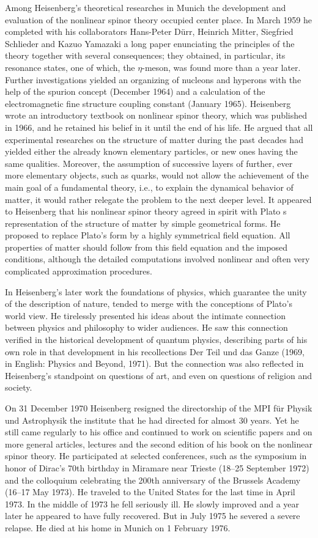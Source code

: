 \documentclass{article}
\begin{document}
Among Heisenberg's theoretical researches in Munich the development and evaluation of the nonlinear spinor theory occupied center place. In March 1959 he completed with his collaborators Hans-Peter Dürr, Heinrich Mitter, Siegfried Schlieder and Kazuo Yamazaki a long paper enunciating the principles of the theory together with several consequences; they obtained, in particular, its resonance states, one of which, the $\eta$-meson, was found more than a year later. Further investigations yielded an organizing of nucleons and hyperons with the help of the spurion concept (December 1964) and a calculation of the electromagnetic fine structure coupling constant (January 1965). Heisenberg wrote an introductory textbook on nonlinear spinor theory, which was published in 1966, and he retained his belief in it until the end of his life. He argued that all experimental researches on the structure of matter during the past decades had yielded either the already known elementary particles, or new ones having the same qualities. Moreover, the assumption of successive layers of further, ever more elementary objects, such as quarks, would not allow the achievement of the main goal of a fundamental theory, i.e., to explain the dynamical behavior of matter, it would rather relegate the problem to the next deeper level. It appeared to Heisenberg that his nonlinear spinor theory agreed in spirit with Plato s representation of the structure of matter by simple geometrical forms. He proposed to replace Plato's form by a highly symmetrical field equation. All properties of matter should follow from this field equation and the imposed conditions, although the detailed computations involved nonlinear and often very complicated approximation procedures.

In Heisenberg's later work the foundations of physics, which guarantee the unity of the description of nature, tended to merge with the conceptions of Plato's world view. He tirelessly presented his ideas about the intimate connection between physics and philosophy to wider audiences. He saw this connection verified in the historical development of quantum physics, describing parts of his own role in that development in his recollections Der Teil und das Ganze (1969, in English: Physics and Beyond, 1971). But the connection was also reflected in Heisenberg's standpoint on questions of art, and even on questions of religion and society.

On 31 December 1970 Heisenberg resigned the directorship of the MPI für Physik und Astrophysik the institute that he had directed for almost 30 years. Yet he still came regularly to his office and continued to work on scientific papers and on more general articles, lectures and the second edition of his book on the nonlinear spinor theory. He participated at selected conferences, such as the symposium in honor of Dirac's 70th birthday in Miramare near Trieste (18--25 September 1972) and the colloquium celebrating the 200th anniversary of the Brussels Academy (16--17 May 1973). He traveled to the United States for the last time in April 1973. In the middle of 1973 he fell seriously ill. He slowly improved and a year later he appeared to have fully recovered. But in July 1975 he severed a severe relapse. He died at his home in Munich on 1 February 1976.
\end{document}
